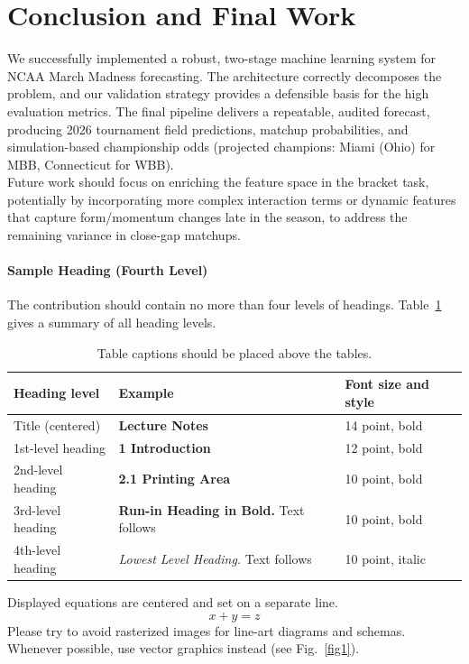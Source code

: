 \documentclass[runningheads]{llncs}
\begin{document}
\section{Conclusion and Final Work}

We successfully implemented a robust, two-stage machine learning system for NCAA March Madness forecasting. The architecture correctly decomposes the problem, and our validation strategy provides a defensible basis for the high evaluation metrics. The final pipeline delivers a repeatable, audited forecast, producing 2026 tournament field predictions, matchup probabilities, and simulation-based championship odds (projected champions: Miami (Ohio) for MBB, Connecticut for WBB). \\
Future work should focus on enriching the feature space in the bracket task, potentially by incorporating more complex interaction terms or dynamic features that capture form/momentum changes late in the season, to address the remaining variance in close-gap matchups.



\paragraph{Sample Heading (Fourth Level)}
The contribution should contain no more than four levels of
headings. Table~\ref{tab1} gives a summary of all heading levels.

\begin{table}
\caption{Table captions should be placed above the
tables.}\label{tab1}
\begin{tabular}{|l|l|l|}
\hline
Heading level &  Example & Font size and style\\
\hline
Title (centered) &  {\Large\bfseries Lecture Notes} & 14 point, bold\\
1st-level heading &  {\large\bfseries 1 Introduction} & 12 point, bold\\
2nd-level heading & {\bfseries 2.1 Printing Area} & 10 point, bold\\
3rd-level heading & {\bfseries Run-in Heading in Bold.} Text follows & 10 point, bold\\
4th-level heading & {\itshape Lowest Level Heading.} Text follows & 10 point, italic\\
\hline
\end{tabular}
\end{table}


\noindent Displayed equations are centered and set on a separate
line.
\begin{equation}
x + y = z
\end{equation}
Please try to avoid rasterized images for line-art diagrams and
schemas. Whenever possible, use vector graphics instead (see
Fig.~\ref{fig1}).
\end{document}
